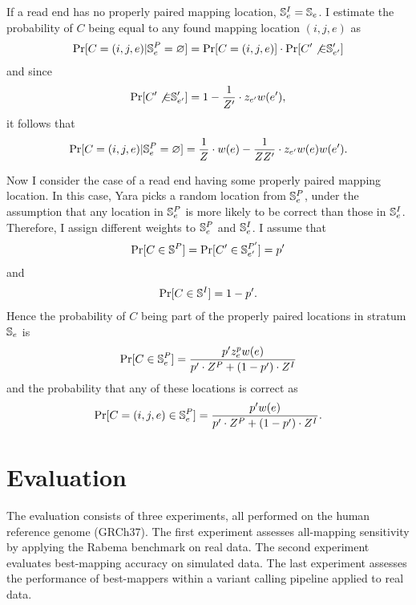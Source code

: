 If a read end has no properly paired mapping location, $\mathbb{S}^I_e = \mathbb{S}_e$.
I estimate the probability of $C$ being equal to any found mapping location $(i,j,e)$ as
\begin{eqnarray}
\Pr[C = (i,j,e) | \mathbb{S}^P_e = \varnothing] = \Pr[C = (i,j,e)] \cdot \Pr[C' \not{\in} \mathbb{S}'_{e'}]
\end{eqnarray}
and since
\begin{eqnarray}
\Pr[C' \not{\in} \mathbb{S}'_{e'}] = 1 - \frac{1}{Z'} \cdot z_{e'} w(e'),
\end{eqnarray}
it follows that
\begin{eqnarray}
\label{eq:yara:mqual:pe:unpaired}
\Pr[C = (i,j,e) | \mathbb{S}^P_e = \varnothing] = \frac{1}{Z} \cdot w(e) - \frac{1}{ZZ'} \cdot z_{e'} w(e) w(e').
\end{eqnarray}

Now I consider the case of a read end having some properly paired mapping location.
In this case, Yara picks a random location from $\mathbb{S}^P_e$, under the assumption that any location in $\mathbb{S}^P_e$ is more likely to be correct than those in $\mathbb{S}^I_e$.
Therefore, I assign different weights to $\mathbb{S}^P_e$ and $\mathbb{S}^I_e$.
I assume that
\begin{eqnarray}
\Pr[C \in \mathbb{S}^P] = \Pr[C' \in \mathbb{S}^{P'}_{e'}] = p'
\end{eqnarray}
and 
\begin{eqnarray}
\Pr[C \in \mathbb{S}^I] = 1 - p'.
\end{eqnarray}
Hence the probability of $C$ being part of the properly paired locations in stratum $\mathbb{S}_e$ is
\begin{eqnarray}
\label{eq:yara:mqual:pe:stratum}
\Pr[C \in \mathbb{S}^P_e] = \frac{p' z^p_e w(e)}{p' \cdot Z^P + (1-p') \cdot Z^I}
\end{eqnarray}
and the probability that any of these locations is correct as
\begin{eqnarray}
\label{eq:yara:mqual:pe:paired}
\Pr[C = (i,j,e) \in \mathbb{S}^P_e] = \frac{p' w(e)}{p' \cdot Z^P + (1-p') \cdot Z^I}.
\end{eqnarray}



\section{Evaluation}
\label{sec:yara:eval}

The evaluation consists of three experiments, all performed on the human reference genome (GRCh37).
The first experiment assesses all-mapping sensitivity by applying the Rabema benchmark on real data.
The second experiment evaluates best-mapping accuracy on simulated data.
The last experiment assesses the performance of best-mappers within a variant calling pipeline applied to real data.

